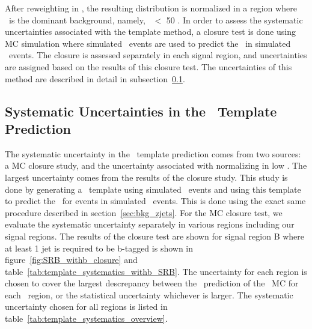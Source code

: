 \clearpage

After reweighting in \pt, the resulting \MET distribution is normalized in a region where \zjets\ is the dominant background, namely, \MET\ $<$ 50 \gev.
In order to assess the systematic uncertainties associated with the template method,
a closure test is done using MC simulation where simulated \gjets\ events are used to predict the \MET\ in simulated \zjets\ events.
The closure is assessed separately in each signal region, and uncertainties are assigned based on the results of this closure test.
The uncertainties of this method are described in detail in subsection~\ref{ssec:bkg_zjetssyst}.

\subsection{Systematic Uncertainties in the \texorpdfstring{\MET}{MET}\ Template Prediction}
\label{ssec:bkg_zjetssyst}

The systematic uncertainty in the \MET\ template prediction comes from two sources:
a MC closure study, and the uncertainty associated with normalizing in low \MET.
The largest uncertainty comes from the results of the closure study.
This study is done by generating a \MET\ template using simulated \gjets\ events and using this template to predict the \MET\ for events in simulated \zjets\ events.
This is done using the exact same procedure described in section~\ref{sec:bkg_zjets}.
For the MC closure test, we evaluate the systematic uncertainty separately in various regions including our signal regions.
The results of the closure test are shown for signal region B where at least 1 jet is required to be b-tagged is shown in figure~\ref{fig:SRB_withb_closure} and table~\ref{tab:template_systematics_withb_SRB}.
The uncertainty for each region is chosen to cover the largest descrepancy between the \gjets\ prediction of the \zjets\ MC for each \MET\ region,
or the statistical uncertainty whichever is larger. 
The systematic uncertainty chosen for all regions is listed in table~\ref{tab:template_systematics_overview}.

